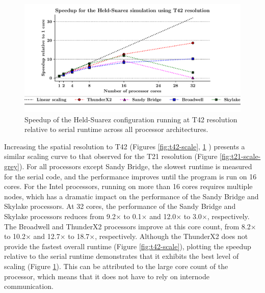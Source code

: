 \documentclass[a4paper,11pt]{report}
\begin{document}
\newpage
\begin{figure}[htbp]
\begin{center}
\includegraphics[width=1\linewidth]{img/speedup-T42-Held_suarez.pdf}
\caption{Speedup of the Held-Suarez configuration running at T42 resolution relative to serial runtime across all processor architectures.}
\label{fig:held-t42-speedup}
\end{center}
\end{figure}
Increasing the spatial resolution to T42 (Figures \ref{fig:t42-scale}, \ref{fig:held-t42-speedup} ) presents a similar scaling curve to that observed for the T21 resolution (Figure \ref{fig:t21-scale-grey}). For all processors except Sandy Bridge, the slowest runtime is measured for the serial code, and the performance improves until the program is run on 16 cores. For the Intel processors, running on more than 16 cores requires multiple nodes, which has a dramatic impact on the performance of the Sandy Bridge and Skylake processors. At 32 cores, the performance of the Sandy Bridge and Skylake processors reduces from 9.2$\times$ to 0.1$\times$ and 12.0$\times$ to 3.0$\times$, respectively. The Broadwell and ThunderX2 processors improve at this core count, from 8.2$\times$ to 10.2$\times$ and 12.7$\times$ to 18.7$\times$, respectively. Although the ThunderX2 does not provide the fastest overall runtime (Figure \ref{fig:t42-scale}), plotting the speedup relative to the serial runtime demonstrates that it exhibits the best level of scaling (Figure \ref{fig:held-t42-speedup}). This can be attributed to the large core count of the processor, which means that it does not have to rely on internode communication. 
\end{document}
